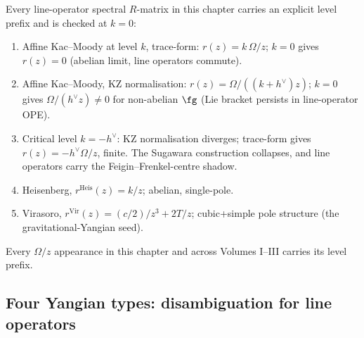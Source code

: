 \begin{convention}
\label{conv:line-operators-rmatrix-level-prefix}
Every line-operator spectral $R$-matrix in this chapter carries an
explicit level prefix and is checked at $k=0$:
\begin{enumerate}[label=\textup{(\roman*)}]
\item Affine Kac--Moody at level $k$, trace-form: $r(z) = k\,\Omega/z$;
$k=0$ gives $r(z)=0$ (abelian limit, line operators commute).
\item Affine Kac--Moody, KZ normalisation: $r(z) = \Omega/((k+h^\vee)z)$;
$k=0$ gives $\Omega/(h^\vee z)\ne 0$ for non-abelian $\fg$ (Lie
bracket persists in line-operator OPE).
\item Critical level $k=-h^\vee$: KZ normalisation diverges; trace-form
gives $r(z) = -h^\vee \Omega/z$, finite. The Sugawara construction
collapses, and line operators carry the Feigin--Frenkel-centre
shadow.
\item Heisenberg, $r^{\mathrm{Heis}}(z) = k/z$; abelian, single-pole.
\item Virasoro, $r^{\mathrm{Vir}}(z) = (c/2)/z^3 + 2T/z$; cubic+simple
pole structure (the gravitational-Yangian seed).
\end{enumerate}
Every $\Omega/z$ appearance in this chapter and across Volumes
I--III carries its level prefix.
\end{convention}

\subsection{Four Yangian types: disambiguation for line operators}
\label{subsec:line-operators-yangian-types}

